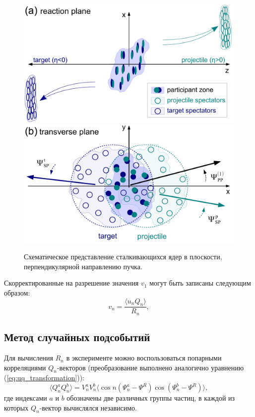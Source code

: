 %
\begin{figure}[ht]
\begin{center}
    \includegraphics[width=0.45\linewidth]{images/paper_v1_midrapidity_spectators_Figure1a_SketchPlanes.pdf}
    \includegraphics[width=0.55\linewidth]{images/paper_v1_midrapidity_spectators_Figure1b_SketchPlanes.pdf}
    \caption{Схематическое представление сталкивающихся ядер в плоскости, перпендикулярной направлению пучка.}
    \label{fig:pp_sp_rp}
\end{center}
\end{figure}
%

Скорректированные на разрешение значения $v_1$ могут быть записаны следующим образом: 
%
\begin{equation}
    v_n =  \frac{ \langle u_n Q_n \rangle }{R_n},
    \label{eq:v1_formula}
\end{equation}
%

\subsection{Метод случайных подсобытий}

Для вычисления $R_n$ в эксперименте можно воспользоваться попарными корреляциями $Q_n$-векторов (преобразование выполнено аналогично уравнению (\ref{eq:uq_transformation})): 
%
\begin{equation}
    \langle Q_n^a Q_n^b \rangle = V^a_n V^b_n \langle \cos n (\Psi^a_n - \Psi^R) \cos(\Psi^b_n - \Psi^R) \rangle,
\end{equation}
%
где индексами $a$ и $b$ обозначены две различных группы частиц, в каждой из которых $Q_n$-вектор вычислялся независимо.

